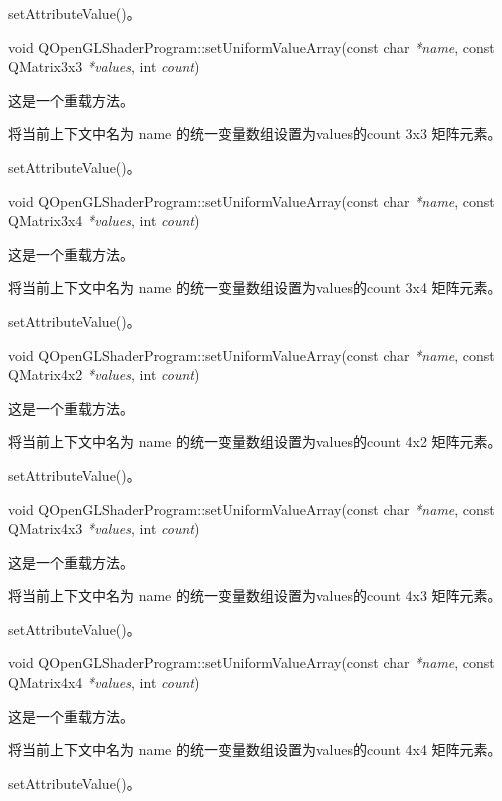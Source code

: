 \begin{seeAlso}
setAttributeValue()。
\end{seeAlso}

void QOpenGLShaderProgram::setUniformValueArray(const char \emph{*name}, const QMatrix3x3 \emph{*values}, int \emph{count})

这是一个重载方法。

将当前上下文中名为 name 的统一变量数组设置为values的count 3x3 矩阵元素。

\begin{seeAlso}
setAttributeValue()。
\end{seeAlso}

void QOpenGLShaderProgram::setUniformValueArray(const char \emph{*name}, const QMatrix3x4 \emph{*values}, int \emph{count})

这是一个重载方法。

将当前上下文中名为 name 的统一变量数组设置为values的count 3x4 矩阵元素。

\begin{seeAlso}
setAttributeValue()。
\end{seeAlso}

void QOpenGLShaderProgram::setUniformValueArray(const char \emph{*name}, const QMatrix4x2 \emph{*values}, int \emph{count})

这是一个重载方法。

将当前上下文中名为 name 的统一变量数组设置为values的count 4x2 矩阵元素。

\begin{seeAlso}
setAttributeValue()。
\end{seeAlso}

void QOpenGLShaderProgram::setUniformValueArray(const char \emph{*name}, const QMatrix4x3 \emph{*values}, int \emph{count})

这是一个重载方法。

将当前上下文中名为 name 的统一变量数组设置为values的count 4x3 矩阵元素。

\begin{seeAlso}
setAttributeValue()。
\end{seeAlso}

void QOpenGLShaderProgram::setUniformValueArray(const char \emph{*name}, const QMatrix4x4 \emph{*values}, int \emph{count})

这是一个重载方法。

将当前上下文中名为 name 的统一变量数组设置为values的count 4x4 矩阵元素。

\begin{seeAlso}
setAttributeValue()。
\end{seeAlso}

